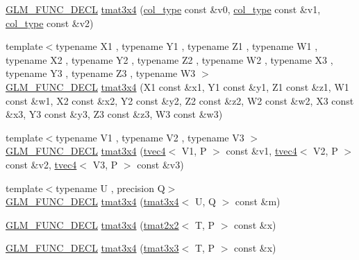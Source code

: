 \begin{DoxyCompactItemize}
\hyperlink{setup_8hpp_ab2d052de21a70539923e9bcbf6e83a51}{G\+L\+M\+\_\+\+F\+U\+N\+C\+\_\+\+D\+E\+CL} \hyperlink{structglm_1_1detail_1_1tmat3x4_a6cab10dc73539c161f81089f4e49944b}{tmat3x4} (\hyperlink{structglm_1_1detail_1_1tmat3x4_aadea597c799e263c7580c0291753d0de}{col\+\_\+type} const \&v0, \hyperlink{structglm_1_1detail_1_1tmat3x4_aadea597c799e263c7580c0291753d0de}{col\+\_\+type} const \&v1, \hyperlink{structglm_1_1detail_1_1tmat3x4_aadea597c799e263c7580c0291753d0de}{col\+\_\+type} const \&v2)
\item 
{\footnotesize template$<$typename X1 , typename Y1 , typename Z1 , typename W1 , typename X2 , typename Y2 , typename Z2 , typename W2 , typename X3 , typename Y3 , typename Z3 , typename W3 $>$ }\\\hyperlink{setup_8hpp_ab2d052de21a70539923e9bcbf6e83a51}{G\+L\+M\+\_\+\+F\+U\+N\+C\+\_\+\+D\+E\+CL} \hyperlink{structglm_1_1detail_1_1tmat3x4_a6fc2dce014e53c227b06f0ad379c92c0}{tmat3x4} (X1 const \&x1, Y1 const \&y1, Z1 const \&z1, W1 const \&w1, X2 const \&x2, Y2 const \&y2, Z2 const \&z2, W2 const \&w2, X3 const \&x3, Y3 const \&y3, Z3 const \&z3, W3 const \&w3)
\item 
{\footnotesize template$<$typename V1 , typename V2 , typename V3 $>$ }\\\hyperlink{setup_8hpp_ab2d052de21a70539923e9bcbf6e83a51}{G\+L\+M\+\_\+\+F\+U\+N\+C\+\_\+\+D\+E\+CL} \hyperlink{structglm_1_1detail_1_1tmat3x4_a6d3f2f2f3a7afbec8ec3b441fb904b20}{tmat3x4} (\hyperlink{structglm_1_1detail_1_1tvec4}{tvec4}$<$ V1, P $>$ const \&v1, \hyperlink{structglm_1_1detail_1_1tvec4}{tvec4}$<$ V2, P $>$ const \&v2, \hyperlink{structglm_1_1detail_1_1tvec4}{tvec4}$<$ V3, P $>$ const \&v3)
\item 
{\footnotesize template$<$typename U , precision Q$>$ }\\\hyperlink{setup_8hpp_ab2d052de21a70539923e9bcbf6e83a51}{G\+L\+M\+\_\+\+F\+U\+N\+C\+\_\+\+D\+E\+CL} \hyperlink{structglm_1_1detail_1_1tmat3x4_ac2ddd33140b6f24cf36d4b7e92a8ca02}{tmat3x4} (\hyperlink{structglm_1_1detail_1_1tmat3x4}{tmat3x4}$<$ U, Q $>$ const \&m)
\item 
\hyperlink{setup_8hpp_ab2d052de21a70539923e9bcbf6e83a51}{G\+L\+M\+\_\+\+F\+U\+N\+C\+\_\+\+D\+E\+CL} \hyperlink{structglm_1_1detail_1_1tmat3x4_aacf61908e9f0d43b3cb3633ff642492f}{tmat3x4} (\hyperlink{structglm_1_1detail_1_1tmat2x2}{tmat2x2}$<$ T, P $>$ const \&x)
\item 
\hyperlink{setup_8hpp_ab2d052de21a70539923e9bcbf6e83a51}{G\+L\+M\+\_\+\+F\+U\+N\+C\+\_\+\+D\+E\+CL} \hyperlink{structglm_1_1detail_1_1tmat3x4_aed8d51605e3f1eff1a600430a30e99b8}{tmat3x4} (\hyperlink{structglm_1_1detail_1_1tmat3x3}{tmat3x3}$<$ T, P $>$ const \&x)

\end{DoxyCompactItemize}
